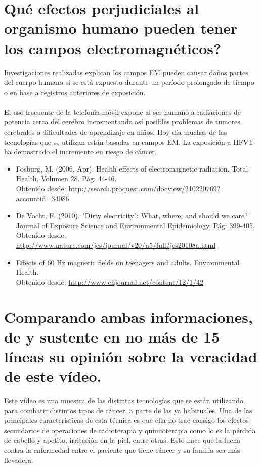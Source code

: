 \documentclass[paper=a4, fontsize=11pt]{scrartcl} %
\begin{document}

\section{\textquestiondown Qu\'e efectos perjudiciales al organismo  humano pueden tener los campos electromagn\'eticos?}
	Investigaciones realizadas explican los campos EM pueden causar da\~nos partes del cuerpo humano si se est\'a expuesto durante un per\'iodo prolongado de tiempo o en base a registros anteriores de exposici\'on.\\
	\\
	El uso frecuente de la telefon\'ia m\'ovil expone al ser humano a  radiaciones de potencia cerca del cerebro incrementando as\'i posibles problemas de tumores cerebrales o dificultades de aprendizaje en ni\~nos. Hoy d\'ia muchas de las tecnolog\'ias que se utilizan est\'an basadas en campos EM. La exposici\'on a HFVT ha demostrado el incremento en riesgo de c\'ancer. 

	\begin{itemize}
		\item Fosburg, M. (2006, Apr). Health effects of electromagnetic radiation. Total Health, Volumen 28. P\'ag: 44-46. \\
		Obtenido desde: \url{http://search.proquest.com/docview/210220769?accountid=34086}
		
		\item De Vocht, F. (2010). "Dirty electricity": What, where, and should we care? Journal of Exposure Science and Environmental Epidemiology, P\'ag: 399-405. \\
		Obtenido desde: \url{http://www.nature.com/jes/journal/v20/n5/full/jes20108a.html}
		
		\item Effects of 60 Hz magnetic fields on teenagers and adults. Environmental Health. \\
		Obtenido desde: \url{http://www.ehjournal.net/content/12/1/42}
	\end{itemize}


\section{Comparando ambas informaciones, de y sustente en no m\'as de 15 l\'ineas su opini\'on sobre la veracidad de este v\'ideo.}

Este v\'ideo es una muestra de las distintas tecnolog\'ias que se est\'an utilizando para combatir distintos tipos de c\'ancer, a parte de las ya habituales. Una de las principales caracter\'isticas de esta t\'ecnica es que ella no trae consigo los efectos secundarios de operaciones de radioterapia y quimioterapia como lo es la p\'erdida de cabello y apetito, irritaci\'on en la piel, entre otras. Esto hace que la lucha contra la enfermedad entre el paciente que tiene c\'ancer y su familia sea m\'as llevadera. \\
\end{document}
